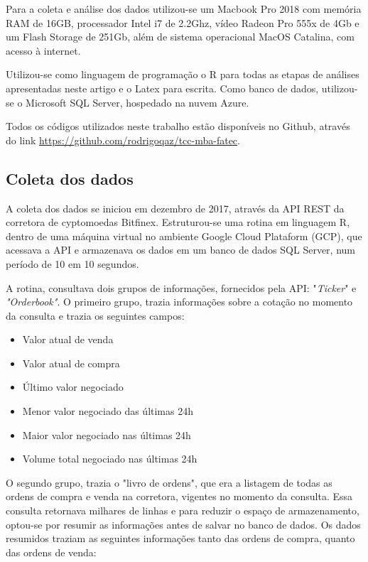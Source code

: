 \documentclass[12pt]{article}
\begin{document}
Para a coleta e análise dos dados utilizou-se um Macbook Pro 2018 com memória 
RAM de 16GB, processador Intel i7 de 2.2Ghz, vídeo Radeon Pro 555x de 4Gb e um
Flash Storage de 251Gb, além de sistema operacional MacOS Catalina, com acesso
à internet.

Utilizou-se como linguagem de programação o R \cite{r:2020} para todas as etapas 
de análises apresentadas neste artigo e o Latex \cite{goossens93} para escrita. 
Como banco de dados, utilizou-se o Microsoft SQL Server, hospedado na nuvem 
Azure.

Todos os códigos utilizados neste trabalho estão disponíveis no Github, através
do link  \url{https://github.com/rodrigoqaz/tcc-mba-fatec}.

\subsection{Coleta dos dados}

A coleta dos dados se iniciou em dezembro de 2017, através da API REST da 
corretora de cyptomoedas Bitfinex. Estruturou-se uma rotina em linguagem R, 
dentro de uma máquina virtual no ambiente Google Cloud Plataform (GCP), 
que acessava a API e armazenava os dados em um banco de dados SQL Server, 
num período de 10 em 10 segundos.

A rotina, consultava dois grupos de informações, fornecidos pela API: 
"\textit{Ticker}" e \textit{"Orderbook"}. 
O primeiro grupo, trazia informações sobre a cotação no momento da consulta e 
trazia os seguintes campos:

\begin{itemize}
  \item Valor atual de venda
  \item Valor atual de compra
  \item Último valor negociado
  \item Menor valor negociado das últimas 24h
  \item Maior valor negociado nas últimas 24h
  \item Volume total negociado nas últimas 24h
\end{itemize}

O segundo grupo, trazia o "livro de ordens", que era a listagem de todas as 
ordens de compra e venda na corretora, vigentes no momento da consulta. 
Essa consulta retornava milhares de linhas e para reduzir o espaço de 
armazenamento, optou-se por resumir as informações antes de salvar no banco de 
dados. Os dados resumidos traziam as seguintes informações tanto das ordens de 
compra, quanto das ordens de venda:
\end{document}
